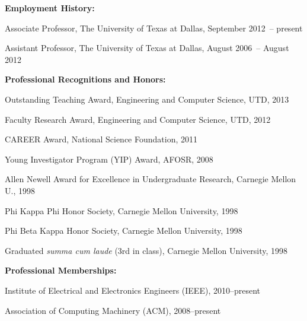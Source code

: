 \documentclass[doublespacing]{utdthesis}
\begin{document}
\begin{vita}
  \bigskip

  {\large\bfseries Employment History:\par}
  \medskip
  Associate Professor, The University of Texas at Dallas,
    September 2012~-- present\par
  Assistant Professor, The University of Texas at Dallas,
    August 2006~-- August 2012\par

  \bigskip

  {\large\bfseries Professional Recognitions and Honors:\par}
  \medskip
  Outstanding Teaching Award, Engineering and Computer Science, UTD, 2013\par
  Faculty Research Award, Engineering and Computer Science, UTD, 2012\par
  CAREER Award, National Science Foundation, 2011\par
  Young Investigator Program (YIP) Award, AFOSR, 2008\par
  Allen Newell Award for Excellence in Undergraduate Research,
    Carnegie Mellon U., 1998\par
  Phi Kappa Phi Honor Society, Carnegie Mellon University, 1998\par
  Phi Beta Kappa Honor Society, Carnegie Mellon University, 1998\par
  Graduated \textit{summa cum laude} (3rd in class), Carnegie Mellon University, 1998\par

  \bigskip

  {\large\bfseries Professional Memberships:\par}
  \medskip
  Institute of Electrical and Electronics Engineers (IEEE), 2010--present\par
  Association of Computing Machinery (ACM), 2008--present\par

\end{vita}  %
\end{document}
